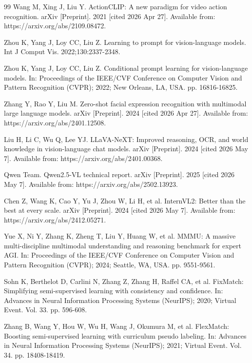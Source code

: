 \documentclass[10pt,letterpaper]{article}
\begin{document}
\begin{thebibliography}{99}
Wang M, Xing J, Liu Y.
ActionCLIP: A new paradigm for video action recognition.
arXiv [Preprint]. 2021 [cited 2026 Apr 27]. Available from:
https://arxiv.org/abs/2109.08472.

Zhou K, Yang J, Loy CC, Liu Z.
Learning to prompt for vision-language models.
Int J Comput Vis. 2022;130:2337-2348.

Zhou K, Yang J, Loy CC, Liu Z.
Conditional prompt learning for vision-language models.
In: Proceedings of the IEEE/CVF Conference on Computer Vision and
Pattern Recognition (CVPR); 2022; New Orleans, LA, USA.
pp. 16816-16825.

Zhang Y, Rao Y, Liu M.
Zero-shot facial expression recognition with multimodal large language
models. arXiv [Preprint]. 2024 [cited 2026 Apr 27]. Available from:
https://arxiv.org/abs/2401.12508.

Liu H, Li C, Wu Q, Lee YJ.
LLaVA-NeXT: Improved reasoning, OCR, and world knowledge in
vision-language chat models. arXiv [Preprint]. 2024 [cited 2026 May 7].
Available from: https://arxiv.org/abs/2401.00368.

Qwen Team.
Qwen2.5-VL technical report. arXiv [Preprint]. 2025 [cited 2026 May 7].
Available from: https://arxiv.org/abs/2502.13923.

Chen Z, Wang K, Cao Y, Yu J, Zhou W, Li H, et al.
InternVL2: Better than the best at every scale.
arXiv [Preprint]. 2024 [cited 2026 May 7]. Available from:
https://arxiv.org/abs/2412.05271.

Yue X, Ni Y, Zhang K, Zheng T, Liu Y, Huang W, et al.
MMMU: A massive multi-discipline multimodal understanding and
reasoning benchmark for expert AGI. In: Proceedings of the IEEE/CVF
Conference on Computer Vision and Pattern Recognition (CVPR); 2024;
Seattle, WA, USA. pp. 9551-9561.

Sohn K, Berthelot D, Carlini N, Zhang Z, Zhang H, Raffel CA, et al.
FixMatch: Simplifying semi-supervised learning with consistency
and confidence.
In: Advances in Neural Information Processing Systems (NeurIPS);
2020; Virtual Event. Vol. 33. pp. 596-608.

Zhang B, Wang Y, Hou W, Wu H, Wang J, Okumura M, et al.
FlexMatch: Boosting semi-supervised learning with curriculum pseudo
labeling.
In: Advances in Neural Information Processing Systems (NeurIPS);
2021; Virtual Event. Vol. 34. pp. 18408-18419.


\end{thebibliography}
\end{document}
